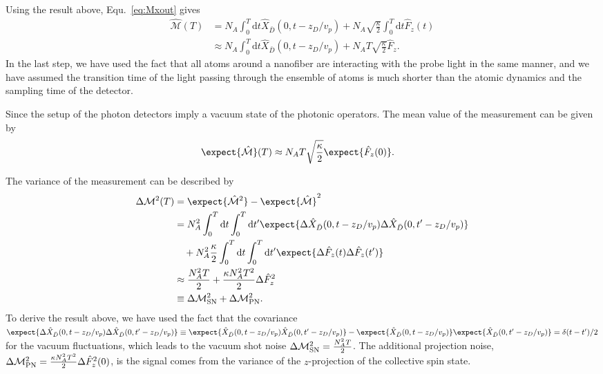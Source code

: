 \documentclass[]{report}
\begin{document}
Using the result above, Equ.~\ref{eq:Mxout} gives
\begin{align}
\hat{\mathcal{M}}(T) &= N_A\int_0^T\mathrm{d}t \hat{X}_{\bar{D}}(0,t-z_D/v_p) + N_A \sqrt{\frac{\kappa}{2}}\int_0^T\mathrm{d}t\hat{F}_z(t)\\
&\approx N_A\int_0^T\mathrm{d}t \hat{X}_{\bar{D}}(0,t-z_D/v_p) + N_AT\sqrt{\frac{\kappa}{2}}\hat{F}_z.
\end{align}
In the last step, we have used the fact that all atoms around a nanofiber are interacting with the probe light in the same manner, and we have assumed the transition time of the light passing through the ensemble of atoms is much shorter than the atomic dynamics and the sampling time of the detector. 

Since the setup of the photon detectors imply a vacuum state of the photonic operators. The mean value of the measurement can be given by 
\begin{align}
\expect{\hat{\mathcal{M}}}(T) &\approx N_AT\sqrt{\frac{\kappa}{2}}\expect{\hat{F}_z(0)}.
\end{align}

The variance of the measurement can be described by
\begin{align}
\Delta \mathcal{M}^2(T) &= \expect{\hat{\mathcal{M}}^2}-\expect{\hat{\mathcal{M}}}^2\\
&= N_A^2 \int_0^T\mathrm{d}t \int_0^T\mathrm{d}t'  \expect{\Delta\hat{X}_{\bar{D}}(0,t-z_D/v_p)\Delta\hat{X}_{\bar{D}}(0,t'-z_D/v_p)} \nonumber\\
&\quad + N_A^2 \frac{\kappa}{2} \int_0^T\mathrm{d}t \int_0^T\mathrm{d}t'\expect{\Delta\hat{F}_z(t)\Delta\hat{F}_z(t')}\\
&\approx \frac{N_A^2T}{2} + \frac{\kappa N_A^2T^2}{2} \Delta\hat{F}_z^2\\
&\equiv \Delta \mathcal{M}_{\rm SN}^2 + \Delta\mathcal{M}_{\rm PN}^2.
\end{align}
To derive the result above, we have used the fact that the covariance $ \expect{\Delta\hat{X}_{\bar{D}}(0,t-z_D/v_p)\Delta\hat{X}_{\bar{D}}(0,t'-z_D/v_p)}\equiv \expect{\hat{X}_{\bar{D}}(0,t-z_D/v_p)\hat{X}_{\bar{D}}(0,t'-z_D/v_p)}-\expect{\hat{X}_{\bar{D}}(0,t-z_D/v_p)}\expect{\hat{X}_{\bar{D}}(0,t'-z_D/v_p)}=\delta(t-t')/2 $ for the vacuum fluctuations, which leads to the vacuum shot noise $ \Delta \mathcal{M}_{\rm SN}^2=\frac{N_A^2T}{2} $. The additional projection noise, $ \Delta\mathcal{M}_{\rm PN}^2=\frac{\kappa N_A^2T^2}{2} \Delta\hat{F}_z^2(0) $, is the signal comes from the variance of the $ z $-projection of the collective spin state.  
\end{document}
